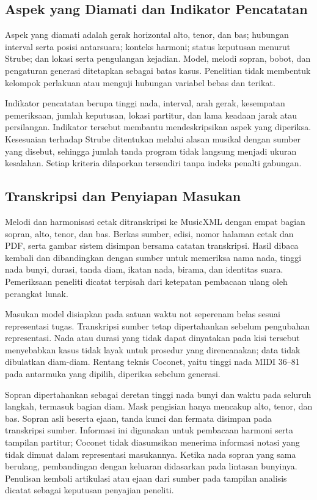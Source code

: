 \subsection{Aspek yang Diamati dan Indikator Pencatatan}\label{sec:variabel-penelitian}

Aspek yang diamati adalah gerak horizontal alto, tenor, dan bas; hubungan interval serta posisi antarsuara; konteks harmoni; status keputusan menurut Strube; dan lokasi serta pengulangan kejadian. Model, melodi sopran, bobot, dan pengaturan generasi ditetapkan sebagai batas kasus. Penelitian tidak membentuk kelompok perlakuan atau menguji hubungan variabel bebas dan terikat.

Indikator pencatatan berupa tinggi nada, interval, arah gerak, kesempatan pemeriksaan, jumlah keputusan, lokasi partitur, dan lama keadaan jarak atau persilangan. Indikator tersebut membantu mendeskripsikan aspek yang diperiksa. Kesesuaian terhadap Strube ditentukan melalui alasan musikal dengan sumber yang disebut, sehingga jumlah tanda program tidak langsung menjadi ukuran kesalahan. Setiap kriteria dilaporkan tersendiri tanpa indeks penalti gabungan.

\subsection{Transkripsi dan Penyiapan Masukan}\label{sec:pengumpulan-melodi}

Melodi dan harmonisasi cetak ditranskripsi ke MusicXML dengan empat bagian sopran, alto, tenor, dan bas. Berkas sumber, edisi, nomor halaman cetak dan PDF, serta gambar sistem disimpan bersama catatan transkripsi. Hasil dibaca kembali dan dibandingkan dengan sumber untuk memeriksa nama nada, tinggi nada bunyi, durasi, tanda diam, ikatan nada, birama, dan identitas suara. Pemeriksaan peneliti dicatat terpisah dari ketepatan pembacaan ulang oleh perangkat lunak.

Masukan model disiapkan pada satuan waktu not seperenam belas sesuai representasi tugas. Transkripsi sumber tetap dipertahankan sebelum pengubahan representasi. Nada atau durasi yang tidak dapat dinyatakan pada kisi tersebut menyebabkan kasus tidak layak untuk prosedur yang direncanakan; data tidak dibulatkan diam-diam. Rentang teknis Coconet, yaitu tinggi nada MIDI 36--81 pada antarmuka yang dipilih, diperiksa \parencite{magentacoconet} sebelum generasi.

Sopran dipertahankan sebagai deretan tinggi nada bunyi dan waktu pada seluruh langkah, termasuk bagian diam. Mask pengisian hanya mencakup alto, tenor, dan bas. Sopran asli beserta ejaan, tanda kunci dan fermata disimpan pada transkripsi sumber. Informasi ini digunakan untuk pembacaan harmoni serta tampilan partitur; Coconet tidak diasumsikan menerima informasi notasi yang tidak dimuat dalam representasi masukannya. Ketika nada sopran yang sama berulang, pembandingan dengan keluaran didasarkan pada lintasan bunyinya. Penulisan kembali artikulasi atau ejaan dari sumber pada tampilan analisis dicatat sebagai keputusan penyajian peneliti.

